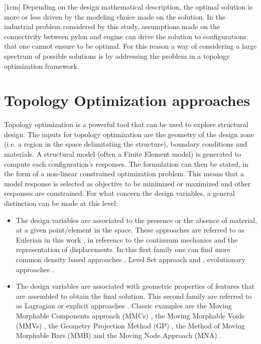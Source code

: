  [1cm] Depending on the design mathematical description, the optimal solution is more or less driven by the modeling choice made on the solution. In the industrial problem considered by this study, assumptions made on the connectivity between pylon and engine can drive the solution to configurations that one cannot ensure to be optimal.  For this reason a way of considering a large spectrum of possible solutions is by addressing the problem in a topology optimization framework. 
\section*{Topology Optimization approaches}
 Topology optimization is a powerful tool that can be used to explore structural design. The inputs for topology optimization are the geometry of the design zone (i.e. a region in the space delimitating the structure), boundary conditions and materials. A structural model (often a Finite Element model) is generated to compute each configuration's responses. 
The formulation can then be stated, in the form of a non-linear constrained optimization problem. This means that a model response is selected as objective to be minimized or maximized and other responses are constrained.
For what concern the design variables, a general distinction can be made at this level:
\begin{itemize}
\item The design variables are associated to the presence or the absence of material, at a given point/element in the space. These approaches are referred to as Eulerian in this work \cite{zhang2016lagrangian}, in reference to the continuum mechanics and the representation of displacements. In this first family one can find more common density based approaches \cite{bendsoe1989optimal,zhou1991coc,bendsoe1995optimization},  Level Set approach \cite{wang2003level,allaire2004structural} and ,  evolutionary approaches \cite{xie1993simple,xia2018bi}. 
\item The design variables are associated with geometric properties of features that are assembled to obtain the final solution.  This second family are referred to as Lagragian or explicit approaches \cite{zhang2016lagrangian}. Classic examples are the Moving Morphable Components approach (MMCs) \cite{guo2014doing,guo2016explicit,zhang2016new,zhang2017new}, the Moving Morphable Voids (MMVs) \cite{zhang2017explicit}, the Geometry Projection Method (GP) \cite{bell2012geometry,norato2015geometryde,zhang2016geometry}, the Method of Moving Morphable
Bars (MMB) \cite{hoang2017topology} and  the Moving Node Approach (MNA) \cite{overvelde2012moving}. 
\end{itemize}
